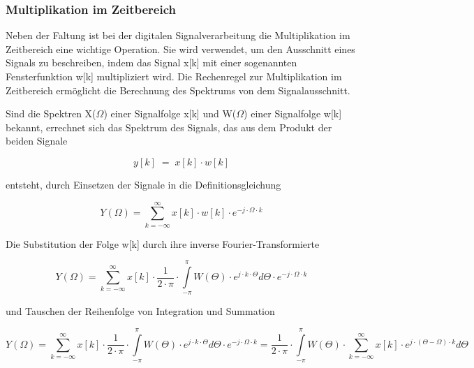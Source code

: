 \subsubsection{Multiplikation im Zeitbereich}

\noindent Neben der Faltung ist bei der digitalen Signalverarbeitung die Multiplikation im Zeitbereich eine wichtige Operation. Sie wird verwendet, um den Ausschnitt eines Signals zu beschreiben, indem das Signal x[k] mit einer sogenannten Fensterfunktion w[k] multipliziert wird. Die Rechenregel zur Multiplikation im Zeitbereich erm\"{o}glicht die Berechnung des Spektrums von dem Signalausschnitt.

\noindent Sind die Spektren X($\Omega$) einer Signalfolge x[k] und W($\Omega$) einer Signalfolge w[k] bekannt, errechnet sich das Spektrum des Signals, das aus dem Produkt der beiden Signale

\begin{equation}\label{eq:sevenseventyseven}
y\left[k\right]\; =\; x\left[k\right]\cdot w\left[k\right]
\end{equation}

\noindent entsteht, durch Einsetzen der Signale in die Definitionsgleichung

\begin{equation}\label{eq:sevenseventyeight}
Y\left(\Omega \right)=\sum _{k=-\infty }^{\infty }x\left[k\right]\cdot w\left[k\right] \cdot e^{-j\cdot \Omega \cdot k}
\end{equation}

\noindent Die Substitution der Folge w[k] durch ihre inverse Fourier-Transformierte 

\begin{equation}\label{eq:sevenseventynine}
Y\left(\Omega \right)=\sum _{k=-\infty}^{\infty}x\left[k\right]\cdot \frac{1}{2\cdot \pi} \cdot \int\limits _{-\pi}^{\pi}W\left(\Theta \right)\cdot e^{j\cdot k\cdot \Theta} d\Theta \cdot e^{-j\cdot \Omega \cdot k}
\end{equation}

\noindent und Tauschen der Reihenfolge von Integration und Summation 

\begin{equation}\label{eq:sevenseighty}
Y\left(\Omega \right)=\sum _{k=-\infty }^{\infty }x\left[k\right]\cdot \frac{1}{2\cdot \pi}\cdot \int\limits _{-\pi}^{\pi}W\left(\Theta \right)\cdot e^{j\cdot k\cdot \Theta } d\Theta \cdot e^{-j\cdot \Omega \cdot k} =\frac{1}{2\cdot \pi } \cdot \int\limits _{-\pi}^{\pi}W\left(\Theta \right)\cdot \sum _{k=-\infty}^{\infty}x\left[k\right]\cdot e^{j\cdot \left(\Theta -\Omega \right)\cdot k} d\Theta 
\end{equation}

